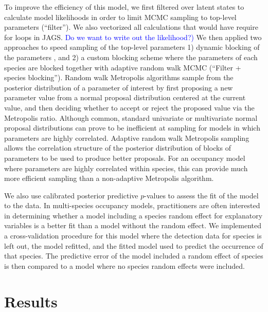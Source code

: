 \documentclass[12pt]{article}
\newcommand{\flagged}[1] {
  \textcolor{blue}{#1}
}
\begin{document}
To improve the efficiency of this model, we first filtered over latent
states to calculate model likelihoods in order to limit MCMC sampling
to top-level parameters (``filter''). We also vectorized all
calculations that would have require for loops in JAGS. \flagged{Do we
  want to write out the likelihood?)} We then applied two approaches
to speed sampling of the top-level parameters 1) dynamic blocking of
the parameters \citep[``filter + autoblocking'',
][]{turek2016efficient}, and 2) a custom blocking scheme where the
parameters of each species are blocked together with adaptive random
walk MCMC (``Filter + species blocking''). Random walk Metropolis
algorithms \citep{metropolis1953equation} sample from the posterior
distribution of a parameter of interest by first proposing a new
parameter value from a normal proposal distribution centered at the
current value, and then deciding whether to accept or reject the
proposed value via the Metropolis ratio.  Although common, standard
univariate or multivariate normal proposal distributions can prove to
be inefficient at sampling for models in which parameters are highly
correlated.  Adaptive random walk Metropolis sampling
\citep{haario98anadaptive} allows the correlation structure of the
posterior distribution of blocks of parameters to be used to produce
better proposals.  For an occupancy model where parameters are highly
correlated within species, this can provide much more efficient
sampling than a non-adaptive Metropolis algorithm.

We also use calibrated posterior predictive $p$-values
\citep{hjort-etal-06} to assess the fit of the model to the data.  In
multi-species occupancy models, practitioners are often interested in
determining whether a model including a species random effect for
explanatory variables is a better fit than a model without the random
effect. We implemented a cross-validation procedure for this model
where the detection data for species is left out, the model refitted,
and the fitted model used to predict the occurrence of that
species. The predictive error of the model included a random effect of
species is then compared to a model where no species random effects
were included.


\section*{Results}
\label{sec:results}
\end{document}

